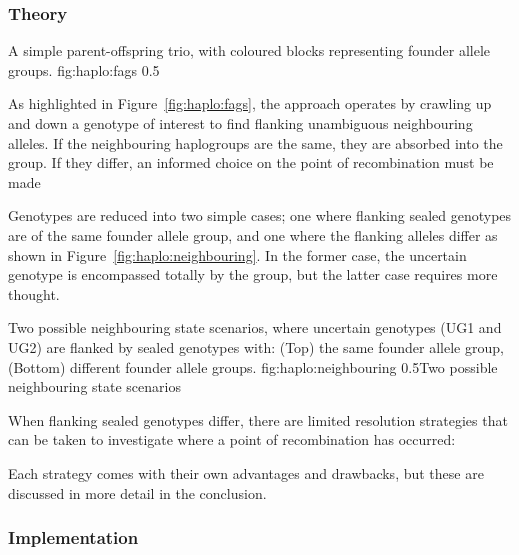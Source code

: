 \subsubsection{Theory}

	{A simple parent-offspring trio, with coloured blocks representing founder allele groups.}
	{fig:haplo:fags}
	{0.5}{}



As highlighted in Figure~\ref{fig:haplo:fags}, the approach operates by crawling up and down a genotype of interest to find flanking unambiguous neighbouring alleles. If the neighbouring haplogroups are the same, they are absorbed into the group. If they differ, an informed choice on the point of recombination must be made

Genotypes are reduced into two simple cases; one where flanking sealed genotypes are of the same founder allele group, and one where the flanking alleles differ as shown in Figure~\ref{fig:haplo:neighbouring}. In the former case, the uncertain genotype is encompassed totally by the group, but the latter case requires more thought.

	{Two possible neighbouring state scenarios, where uncertain genotypes (UG1 and UG2) are flanked by sealed genotypes with: (Top) the same founder allele group, (Bottom) different founder allele groups.}
	{fig:haplo:neighbouring}
	{0.5}{Two possible neighbouring state scenarios}

When flanking sealed genotypes differ, there are limited resolution strategies that can be taken to investigate where a point of recombination has occurred:

\begin{enumerate}

Each strategy comes with their own advantages and drawbacks, but these are discussed in more detail in the conclusion.
\end{enumerate}

\subsubsection{Implementation}

